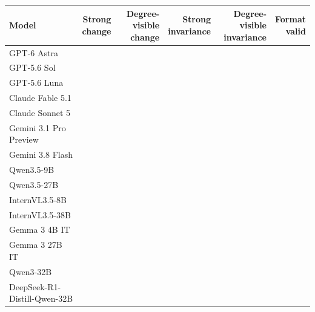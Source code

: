 \begin{tabular}{@{}lrrrrr@{}}
\toprule
Model & \shortstack{Strong\\change} & \shortstack{Degree-visible\\change} & \shortstack{Strong\\invariance} & \shortstack{Degree-visible\\invariance} & \shortstack{Format\\valid}\\
\midrule
GPT-6 Astra &  &  &  &  & \\
GPT-5.6 Sol &  &  &  &  & \\
GPT-5.6 Luna &  &  &  &  & \\
Claude Fable 5.1 &  &  &  &  & \\
Claude Sonnet 5 &  &  &  &  & \\
Gemini 3.1 Pro Preview &  &  &  &  & \\
Gemini 3.8 Flash &  &  &  &  & \\
Qwen3.5-9B &  &  &  &  & \\
Qwen3.5-27B &  &  &  &  & \\
InternVL3.5-8B &  &  &  &  & \\
InternVL3.5-38B &  &  &  &  & \\
Gemma 3 4B IT &  &  &  &  & \\
Gemma 3 27B IT &  &  &  &  & \\
Qwen3-32B &  &  &  &  & \\
DeepSeek-R1-Distill-Qwen-32B &  &  &  &  & \\
\bottomrule
\end{tabular}

